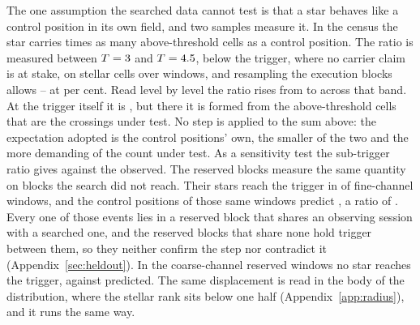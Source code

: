 The one assumption the searched data cannot test is that a star behaves like
a control position in its own field, and two samples measure it. In the census
the star carries \CeStep{} times as many above-threshold cells as a control
position. The ratio is measured between $T=3$ and
$T=4.5$, below the trigger, where no carrier claim is at stake, on
\CeStepNStar{} stellar cells over \CeStepNWin{} windows, and resampling the
execution blocks allows \CeStepLo--\CeStepHi{} at \CeCovPct{} per cent.
Read level by level the ratio rises from \CkRatioLo{} to \CkRatioHi{}
across that band. At the trigger itself it is \CeTrAt, but there it is formed
from the \CeStepNX{} above-threshold cells that are the crossings under test.
No step is applied to the sum above: the expectation adopted is the control
positions' own, the smaller of the two and the more demanding of the count
under test. As a sensitivity test the sub-trigger ratio gives \CeExpX{}
against the \CeObs{} observed. The reserved blocks measure
the same quantity on blocks the search did not reach. Their stars reach the
trigger in \StHoObs{} of \StHoNFine{} fine-channel windows, and the control
positions of those same windows predict \StHoExpFine, a ratio of
\StHoRatio. Every one of those
events lies in a reserved block that shares an observing session with a
searched one, and the \HsIndBlocks{} reserved blocks that share none hold
\HsIndObsWord{} trigger \HsIndObsNoun{} between them, so they neither confirm
the step nor contradict it (Appendix~\ref{sec:heldout}). In the \StHoNCoarse{} coarse-channel
reserved windows no star reaches the trigger, against \StHoExpCoarse{}
predicted. The same displacement is read in the body of the distribution,
where the stellar rank sits below one half (Appendix~\ref{app:radius}), and it
runs the same way.

